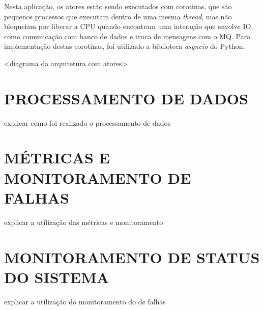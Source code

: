 Nesta aplicação, os atores estão sendo executados com corotinas, que são
pequenos processos que executam dentro de uma mesma \emph{thread}, mas não
bloqueiam por liberar a \ac{CPU} quando encontram uma interação que envolve
\ac{IO}, como comunicação com banco de dados e troca de mensagens com o
\ac{MQ}. Para implementação destas corotinas, foi utilizado a biblioteca
\emph{asyncio} do Python.

<diagrama da arquitetura com atores>

\section{PROCESSAMENTO DE DADOS}

explicar como foi realizado o processamento de dados

\section{MÉTRICAS E MONITORAMENTO DE FALHAS}

explicar a utilização das métricas e monitoramento

\section{MONITORAMENTO DE STATUS DO SISTEMA}

explicar a utilização do monitoramento do de falhas

